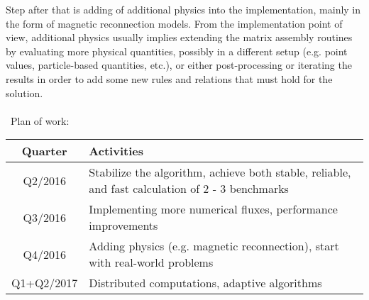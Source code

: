 Step after that is adding of additional physics into the implementation, mainly in the form of magnetic reconnection models. From the implementation point of view, additional physics usually implies extending the matrix assembly routines by evaluating more physical quantities, possibly in a different setup (e.g. point values, particle-based quantities, etc.), or either post-processing or iterating the results in order to add some new rules and relations that must hold for the solution.
\\\\\
Plan of work:
\begin{table}[h!]
	\centering
	\begin{tabular}{||c|p{5cm}||} 
		\hline		\hline
		Quarter & Activities \\
		\hline\hline
		Q2/2016 & Stabilize the algorithm, achieve both stable, reliable, and fast calculation of 2 - 3 benchmarks\\
		\hline
		Q3/2016 &  Implementing more numerical fluxes, performance improvements \\
		\hline
		Q4/2016 & Adding physics (e.g. magnetic reconnection), start with real-world problems  \\
		\hline
		Q1+Q2/2017 & Distributed computations, adaptive algorithms \\
		\hline		\hline
	\end{tabular}
\end{table}

